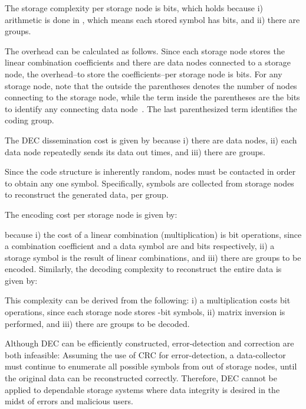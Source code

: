 \documentclass[10pt,journal,letterpaper,compsoc]{IEEEtran}
\newcommand{\0}{{\bf 0}}
\begin{document}
The storage complexity per storage node is  bits, which holds because i) arithmetic is done in , which means each stored symbol has  bits, and ii) there are  groups.

The overhead can be calculated as follows. Since each storage node stores the linear combination coefficients and there are   data nodes connected to a storage node, the overhead--to store the coefficients--per storage node is 
 bits. For any storage node, note that the  outside the parentheses denotes the number of nodes connecting to the storage node, while the  term inside the parentheses are the bits to identify any connecting data node~\cite{DIM06}. The last parenthesized term identifies the coding group.


The DEC dissemination cost is given by   because i) there are  data  nodes, ii) each data node repeatedly sends its data out  times, and iii) there are  groups.

Since the code structure is inherently random,  nodes must be contacted in order to obtain any one symbol. Specifically,  symbols are collected from  storage nodes to reconstruct the generated data, per group.

The encoding cost per storage node is given by: 

because i) the cost of a linear combination (multiplication) is  bit operations, since a combination coefficient and a data symbol are  and  bits respectively, ii) a storage symbol is the result of  linear combinations, and iii) there are  groups to be encoded.
Similarly, the decoding complexity to reconstruct the entire data is given by: 

This complexity can be derived from the following: i) a multiplication costs  bit operations, since each storage node stores -bit symbols, ii) matrix inversion is performed, and iii) there are  groups to be decoded.

Although DEC can
be efficiently constructed, error-detection and correction are both infeasible: Assuming the use of CRC for error-detection, a data-collector must continue to enumerate all possible  symbols from  out of  storage nodes, until the original data can be reconstructed correctly. Therefore, DEC cannot be applied to dependable storage systems where data integrity is desired in the midst of errors and malicious users.
\end{document}
